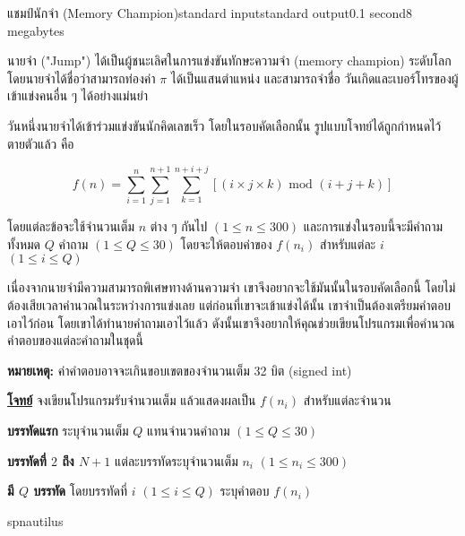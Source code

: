 \documentclass[11pt,a4paper]{article}
\begin{document}
\begin{problem}{แชมป์นักจำ (Memory Champion)}{standard input}{standard output}{0.1 second}{8 megabytes}

นายจำ ("Jump") ได้เป็นผู้ชนะเลิศในการแข่งขันทักษะความจำ (memory champion) ระดับโลก โดยนายจำได้ชื่อว่าสามารถท่องค่า $\pi$ ได้เป็นแสนตำแหน่ง และสามารถจำชื่อ วันเกิดและเบอร์โทรของผู้เข้าแข่งคนอื่น ๆ ได้อย่างแม่นยำ

วันหนึ่งนายจำได้เข้าร่วมแข่งขันนักคิดเลขเร็ว โดยในรอบคัดเลือกนั้น รูปแบบโจทย์ได้ถูกกำหนดไว้ตายตัวแล้ว คือ

$$f(n) = \sum_{i=1}^{n}\sum_{j=1}^{n+1}\sum_{k=1}^{n+i+j} [(i\times j\times k) \text{ mod } (i+j+k)]$$

โดยแต่ละข้อจะใช้จำนวนเต็ม $n$ ต่าง ๆ กันไป $(1 \leq n \leq 300)$ และการแข่งในรอบนี้จะมีคำถามทั้งหมด $Q$ คำถาม $(1 \leq Q \leq 30)$ โดยจะให้ตอบค่าของ $f(n_i)$ สำหรับแต่ละ $i$ $(1 \leq i \leq Q)$

เนื่องจากนายจำมีความสามารถพิเศษทางด้านความจำ เขาจึงอยากจะใช้มันนั้นในรอบคัดเลือกนี้ โดยไม่ต้องเสียเวลาคำนวณในระหว่างการแข่งเลย แต่ก่อนที่เขาจะเข้าแข่งได้นั้น เขาจำเป็นต้องเตรียมคำตอบเอาไว้ก่อน โดยเขาได้ทำนายคำถามเอาไว้แล้ว ดังนั้นเขาจึงอยากให้คุณช่วยเขียนโปรแกรมเพื่อคำนวณคำตอบของแต่ละคำถามในชุดนี้

\textbf{หมายเหตุ:} ค่าคำตอบอาจจะเกินขอบเขตของจำนวนเต็ม 32 บิต (signed int)

\underline{\textbf{โจทย์}} จงเขียนโปรแกรมรับจำนวนเต็ม แล้วแสดงผลเป็น $f(n_i)$ สำหรับแต่ละจำนวน

\InputFile
\textbf{บรรทัดแรก} ระบุจำนวนเต็ม $Q$ แทนจำนวนคำถาม $(1 \leq Q \leq 30)$

\textbf{บรรทัดที่ $2$ ถึง $N+1$} แต่ละบรรทัดระบุจำนวนเต็ม $n_i$ $(1 \leq n_i \leq 300)$

\OutputFile

\textbf{มี $Q$ บรรทัด} โดยบรรทัดที่ $i$ $(1 \leq i \leq Q)$ ระบุคำตอบ $f(n_i)$ 

\Examples

\begin{example}
%
%
\end{example}

\Source

spnautilus

\end{problem}
\end{document}
